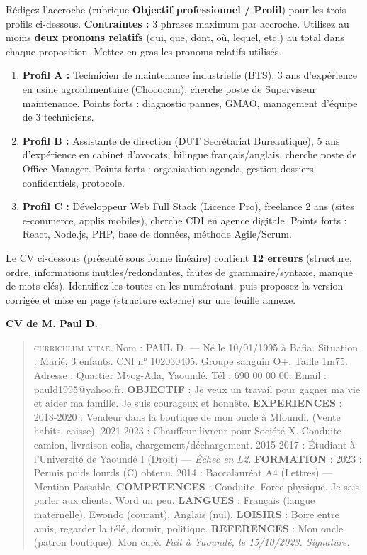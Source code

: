 \documentclass[11pt]{article}
\begin{document}
\begin{exercice}
Rédigez l'accroche (rubrique \textbf{Objectif professionnel / Profil}) pour les trois profils ci-dessous.
\textbf{Contraintes :} 3 phrases maximum par accroche. Utilisez au moins \textbf{deux pronoms relatifs} (qui, que, dont, où, lequel, etc.) au total dans chaque proposition. Mettez en gras les pronoms relatifs utilisés.
\begin{enumerate}
\item \textbf{Profil A :} Technicien de maintenance industrielle (BTS), 3 ans d'expérience en usine agroalimentaire (Chococam), cherche poste de Superviseur maintenance. Points forts : diagnostic pannes, GMAO, management d'équipe de 3 techniciens.
\item \textbf{Profil B :} Assistante de direction (DUT Secrétariat Bureautique), 5 ans d'expérience en cabinet d'avocats, bilingue français/anglais, cherche poste de Office Manager. Points forts : organisation agenda, gestion dossiers confidentiels, protocole.
\item \textbf{Profil C :} Développeur Web Full Stack (Licence Pro), freelance 2 ans (sites e-commerce, applis mobiles), cherche CDI en agence digitale. Points forts : React, Node.js, PHP, base de données, méthode Agile/Scrum.
\end{enumerate}
\end{exercice}

\begin{exercice}
Le CV ci-dessous (présenté sous forme linéaire) contient \textbf{12 erreurs} (structure, ordre, informations inutiles/redondantes, fautes de grammaire/syntaxe, manque de mots-clés). Identifiez-les toutes en les numérotant, puis proposez la version corrigée et mise en page (structure externe) sur une feuille annexe.

\textbf{CV de M. Paul D.}
\begin{quote}
\textsc{curriculum vitae}. Nom : PAUL D. — Né le 10/01/1995 à Bafia. Situation : Marié, 3 enfants. CNI n° 102030405. Groupe sanguin O+. Taille 1m75. Adresse : Quartier Mvog-Ada, Yaoundé. Tél : 690 00 00 00. Email : pauld1995@yahoo.fr.
\textbf{OBJECTIF} : Je veux un travail pour gagner ma vie et aider ma famille. Je suis courageux et honnête.
\textbf{EXPERIENCES} :
2018-2020 : Vendeur dans la boutique de mon oncle à Mfoundi. (Vente habits, caisse).
2021-2023 : Chauffeur livreur pour Société X. Conduite camion, livraison colis, chargement/déchargement.
2015-2017 : Étudiant à l'Université de Yaoundé I (Droit) — \textit{Échec en L2}.
\textbf{FORMATION} :
2023 : Permis poids lourds (C) obtenu.
2014 : Baccalauréat A4 (Lettres) — Mention Passable.
\textbf{COMPETENCES} : Conduite. Force physique. Je sais parler aux clients. Word un peu.
\textbf{LANGUES} : Français (langue maternelle). Ewondo (courant). Anglais (nul).
\textbf{LOISIRS} : Boire entre amis, regarder la télé, dormir, politique.
\textbf{REFERENCES} : Mon oncle (patron boutique). Mon curé.
\textit{Fait à Yaoundé, le 15/10/2023. Signature.}
\end{quote}
\end{exercice}
\end{document}

